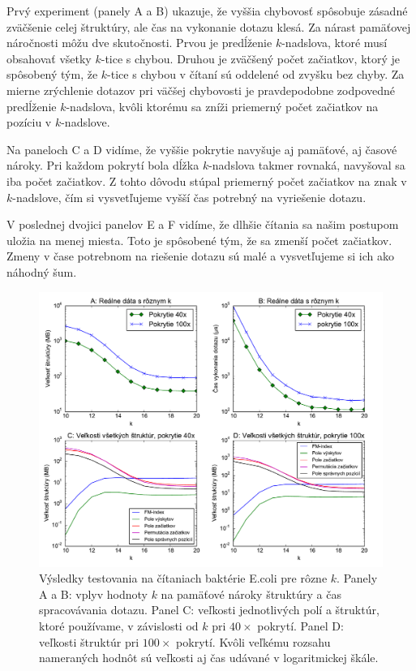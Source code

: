 Prvý experiment (panely A a B) ukazuje, že vyššia chybovosť spôsobuje zásadné zväčšenie celej štruktúry, ale
čas na vykonanie dotazu klesá. Za nárast pamäťovej náročnosti môžu dve skutočnosti. Prvou
je predĺženie $k$-nadslova, ktoré musí obsahovať všetky $k$-tice s chybou. Druhou je zväčšený
počet začiatkov, ktorý je spôsobený tým, že $k$-tice s chybou v čítaní sú oddelené od zvyšku
bez chyby. Za mierne zrýchlenie dotazov pri väčšej chybovosti je pravdepodobne zodpovedné
predĺženie $k$-nadslova, kvôli ktorému sa zníži priemerný počet začiatkov na pozíciu
v $k$-nadslove.

Na paneloch C a D vidíme, že vyššie pokrytie navyšuje aj pamäťové, aj časové nároky.
Pri každom pokrytí bola dĺžka $k$-nadslova takmer rovnaká, navyšoval sa iba počet začiatkov.
Z tohto dôvodu stúpal priemerný počet začiatkov na znak v $k$-nadslove, čím si vysvetľujeme
vyšší čas potrebný na vyriešenie dotazu.

V poslednej dvojici panelov E a F vidíme, že dlhšie čítania sa našim postupom uložia na menej
miesta. Toto je spôsobené tým, že sa zmenší počet začiatkov. Zmeny v čase potrebnom na
riešenie dotazu sú malé a vysvetľujeme si ich ako náhodný šum.

\begin{figure}

\centerline{\includegraphics[width=1\textwidth]{images/chart_difks.pdf}}

\caption[E.coli dáta s rôznym $k$]{Výsledky testovania na čítaniach baktérie E.coli pre rôzne $k$.
Panely A a B: vplyv hodnoty $k$ na
pamäťové nároky štruktúry a čas spracovávania dotazu. Panel C: veľkosti
jednotlivých polí a štruktúr, ktoré používame, v závislosti od $k$ pri $40\times$ pokrytí.
Panel D: veľkosti štruktúr pri $100\times$ pokrytí. Kvôli veľkému rozsahu nameraných hodnôt sú veľkosti
aj čas udávané v logaritmickej škále.}

\label{chart:difks}

\end{figure}


